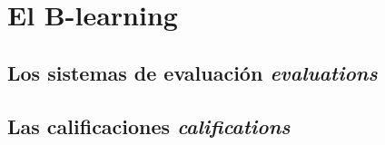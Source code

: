 \chapter{El B-learning}

\section{Los sistemas de evaluación \emph{evaluations}}
\section{Las calificaciones \emph{califications}}
